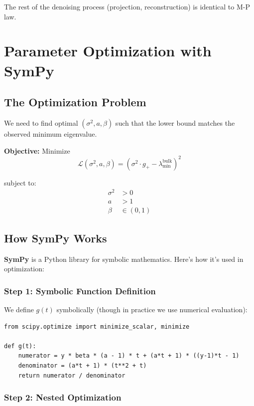 \documentclass[12pt,a4paper]{article}
\begin{document}
The rest of the denoising process (projection, reconstruction) is identical to M-P law.

\section{Parameter Optimization with SymPy}

\subsection{The Optimization Problem}

We need to find optimal $(\sigma^2, a, \beta)$ such that the lower bound matches the observed minimum eigenvalue.

\textbf{Objective:} Minimize
\begin{equation}
\mathcal{L}(\sigma^2, a, \beta) = \left(\sigma^2 \cdot g_+ - \lambda_{\min}^{\text{bulk}}\right)^2
\end{equation}

subject to:
\begin{align}
\sigma^2 &> 0 \\
a &> 1 \\
\beta &\in (0, 1)
\end{align}

\subsection{How SymPy Works}

\textbf{SymPy} is a Python library for symbolic mathematics. Here's how it's used in optimization:

\subsubsection{Step 1: Symbolic Function Definition}

We define $g(t)$ symbolically (though in practice we use numerical evaluation):

\begin{verbatim}
from scipy.optimize import minimize_scalar, minimize

def g(t):
    numerator = y * beta * (a - 1) * t + (a*t + 1) * ((y-1)*t - 1)
    denominator = (a*t + 1) * (t**2 + t)
    return numerator / denominator
\end{verbatim}

\subsubsection{Step 2: Nested Optimization}
\end{document}
